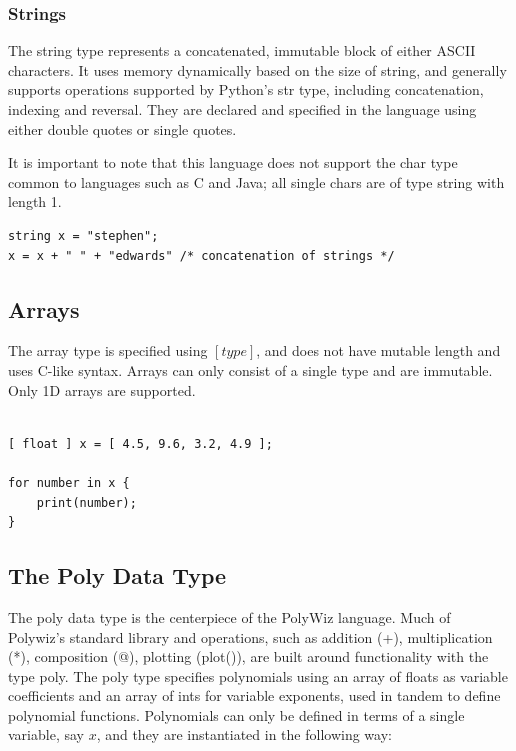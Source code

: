 \documentclass{article}
\begin{document}
\subsubsection{Strings}
The string type represents a concatenated, immutable block of either ASCII characters. It uses memory dynamically based on the size of string, and generally supports operations supported by Python's str type, including concatenation, indexing and reversal. They are declared and specified in the language using either double quotes or single quotes.

It is important to note that this language does not support the char type common to languages such as C and Java; all single chars are of type string with length 1.

\begin{lstlisting}
string x = "stephen";
x = x + " " + "edwards" /* concatenation of strings */
\end{lstlisting}
\subsection{Arrays}
The array type is specified using $[type]$, and does not have mutable length and uses C-like syntax. Arrays can only consist of a single type and are immutable. Only 1D arrays are supported.

\begin{lstlisting}

[ float ] x = [ 4.5, 9.6, 3.2, 4.9 ];

for number in x {
	print(number);
}

\end{lstlisting}
\subsection{The Poly Data Type}
The poly data type is the centerpiece of the PolyWiz language. Much of Polywiz's standard library and operations, such as addition (+), multiplication (*), composition (@), plotting (plot()), are built around functionality with the type poly. The poly type specifies polynomials using an array of floats as variable coefficients and an array of ints for variable exponents, used in tandem to define polynomial functions. Polynomials can only be defined in terms of a single variable, say $x$, and they are instantiated in the following way:
\end{document}
